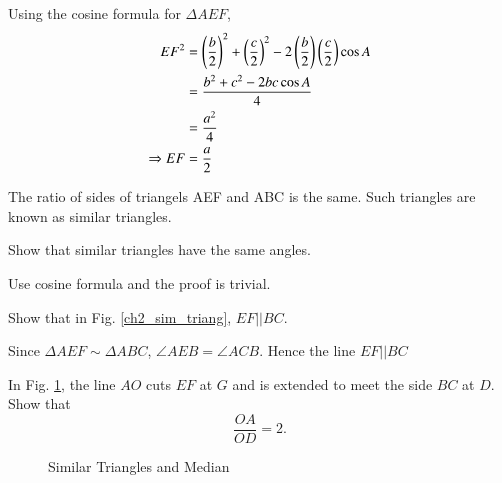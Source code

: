 \proof Using the cosine formula for $\Delta AEF$,
%
\begin{align}
EF^2 &= \left(\frac{b}{2}\right)^2 + \left(\frac{c}{2}\right)^2 - 2 \left(\frac{b}{2}\right)\left(\frac{c}{2}\right) \cos A \\
&= \frac{b^2 + c^2 - 2bc \cos A}{4} \\
&= \frac{a^2}{4} \\
\Rightarrow EF &= \frac{a}{2}
\end{align}
%
\begin{definition}
	The ratio of sides of triangels AEF and ABC is the same.  Such triangles are known as similar triangles.
\end{definition}
\begin{problem}
	Show that similar triangles have the same angles.
\end{problem}
\proof Use cosine formula and the proof is trivial.
\begin{problem}
	Show that in Fig. \ref{ch2_sim_triang}, $EF || BC$.
\end{problem}
\proof Since $\Delta AEF \sim \Delta ABC$, $\angle AEB = \angle ACB$.  Hence the line $EF||BC$
%
%
\begin{problem}
	In Fig. \ref{ch2_median_3}, the line $AO$ cuts $EF$ at $G$ and is extended to meet the side $BC$ at $D$.  Show that 
	\begin{equation}
	\frac{OA}{OD} = 2.
	\end{equation}
\end{problem}
\begin{figure}[!h]
	\begin{center}
		
		\resizebox{\columnwidth}{!}{}
	\end{center}
	\caption{Similar Triangles and Median}
	\label{ch2_median_3}	
\end{figure}

